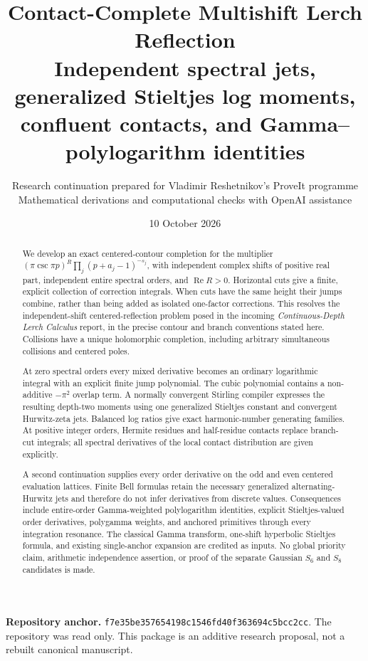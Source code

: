\documentclass[11pt,letterpaper]{article}
\title{\textbf{Contact-Complete Multishift Lerch Reflection}\\[6pt]
\large Independent spectral jets, generalized Stieltjes log moments,\\
confluent contacts, and Gamma--polylogarithm identities}
\author{Research continuation prepared for Vladimir Reshetnikov's ProveIt programme\\
\small Mathematical derivations and computational checks with OpenAI assistance}
\date{10 October 2026}
\theoremstyle{definition}\newtheorem{definition}[theorem]{Definition}
\theoremstyle{remark}\newtheorem{remark}[theorem]{Remark}
\newcommand{\Rea}{\operatorname{Re}}\newcommand{\Ima}{\operatorname{Im}}
\newcommand{\src}[1]{\nolinkurl{#1}}
\newcommand{\pin}{\src{f7e35be357654198c1546fd40f363694c5bcc2cc}}
\begin{document}
\maketitle
\begin{abstract}
We develop an exact centered-contour completion for the multiplier
$(\pi\csc\pi p)^R\prod_j(p+a_j-1)^{-s_j}$, with independent complex
shifts of positive real part, independent entire spectral orders, and
$\Rea R>0$. Horizontal cuts give a finite, explicit collection of correction
integrals. When cuts have the same height their jumps combine, rather than
being added as isolated one-factor corrections. This resolves the
independent-shift centered-reflection problem posed in the incoming
\emph{Continuous-Depth Lerch Calculus} report, in the precise contour and
branch conventions stated here. Collisions have a unique holomorphic
completion, including arbitrary simultaneous collisions and centered poles.

At zero spectral orders every mixed derivative becomes an ordinary
logarithmic integral with an explicit finite jump polynomial. The cubic
polynomial contains a non-additive $-\pi^2$ overlap term. A normally
convergent Stirling compiler expresses the resulting depth-two moments
using one generalized Stieltjes constant and convergent Hurwitz-zeta jets.
Balanced log ratios give exact harmonic-number generating families.
At positive integer orders, Hermite residues and half-residue contacts
replace branch-cut integrals; all spectral derivatives of the local
contact distribution are given explicitly.

A second continuation supplies every order derivative on the odd and even
centered evaluation lattices. Finite Bell formulas retain the necessary
generalized alternating-Hurwitz jets and therefore do not infer derivatives
from discrete values. Consequences include entire-order Gamma-weighted
polylogarithm identities, explicit Stieltjes-valued order derivatives,
polygamma weights, and anchored primitives through every integration
resonance. The classical Gamma transform, one-shift hyperbolic Stieltjes
formula, and existing single-anchor expansion are credited as inputs.
No global priority claim, arithmetic independence assertion, or proof of
the separate Gaussian $S_6$ and $S_8$ candidates is made.
\end{abstract}
\vspace{4pt}
\noindent\textbf{Repository anchor.} \pin. The repository was read only.
This package is an additive research proposal, not a rebuilt canonical manuscript.
\clearpage
\begingroup\small\setlength{\parskip}{0pt}\tableofcontents\endgroup
\clearpage
\end{document}

